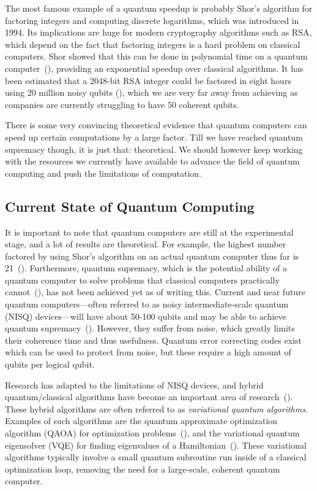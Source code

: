 \documentclass[a4paper,10pt]{article}
\begin{document}
The most famous example of a quantum speedup is probably Shor's algorithm for factoring integers and computing discrete logarithms, which was introduced in 1994.
Its implications are huge for modern cryptography algorithms such as RSA, which depend on the fact that factoring integers is a hard problem on classical computers.
Shor showed that this can be done in polynomial time on a quantum computer~(\cite{shor-factoring}), providing an exponential speedup over classical algorithms. 
It has been estimated that a 2048-bit RSA integer could be factored in eight hours using 20 million noisy qubits (\cite{shor-20mil}), which we are very far away from achieving as companies are currently struggling to have 50 coherent qubits.

There is some very convincing theoretical evidence that quantum computers can speed up certain computations by a large factor.
Till we have reached quantum supremacy though, it is just that: theoretical.
We should however keep working with the resources we currently have available to advance the field of quantum computing and push the limitations of computation.

\subsection{Current State of Quantum Computing}
It is important to note that quantum computers are still at the experimental stage, and a lot of results are theoretical.
For example, the highest number factored by using Shor's algorithm on an actual quantum computer thus far is 21~(\cite{shor-21}).
Furthermore, quantum supremacy, which is the potential ability of a quantum computer to solve problems that classical computers practically cannot~(\cite{preskill-qc}), has not been achieved yet as of writing this.
Current and near future quantum computers---often referred to as noisy intermediate-scale quantum (NISQ) devices---will have about 50-100 qubits and may be able to achieve quantum supremacy~(\cite{preskill-nisq}).
However, they suffer from noise, which greatly limits their coherence time and thus usefulness.
Quantum error correcting codes exist which can be used to protect from noise, but these require a high amount of qubits per logical qubit.

Research has adapted to the limitations of NISQ devices, and hybrid quantum/classical algorithms have become an important area of research~(\cite{mcclean2016theory}).
These hybrid algorithms are often referred to as \emph{variational quantum algorithms}.
Examples of such algorithms are the quantum approximate optimization algorithm (QAOA) for optimization problems~(\cite{qaoa}), and the variational quantum eigensolver (VQE) for finding eigenvalues of a Hamiltonian~(\cite{vqe}).
These variational algorithms typically involve a small quantum subroutine run inside of a classical optimization loop, removing the need for a large-scale, coherent quantum computer.
\end{document}
